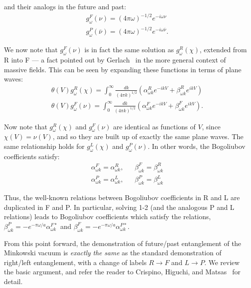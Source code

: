 \documentclass[aps,prl,showpacs,12pt]{revtex4}
\begin{document}
and their analogs in the future and past:
\begin{eqnarray*}
g_{\omega}^{F}(\nu) = (4 \pi \omega)^{-1/2} e^{-i \omega \nu} \\
g_{\omega}^{P}(\bar{\nu}) = (4 \pi \omega)^{-1/2} e^{-i \omega \bar{\nu}}.
\end{eqnarray*}

We now note that $g_{\omega}^{F}(\nu)$ is in fact the same solution as $g_{\omega}^{R}(\chi)$, extended from R into F \---- a fact pointed out by Gerlach~\cite{gerlach1, crispino1} in the more general context of massive fields.  This can be seen by expanding these functions in terms of plane waves:
\begin{eqnarray}
 \theta(V) g_{\omega}^{R}(\chi) = \int_{0}^{\infty} \frac{dk}{(4 \pi k)^{1/2}}\left( \alpha^{R}_{\omega k} e^{-ikV} + \beta^{R}_{\omega k} e^{ikV} \right) \\
 \theta(V) g_{\omega}^{F}(\nu) = \int_{0}^{\infty} \frac{dk}{(4 \pi k)^{1/2}}\left( \alpha^{F}_{\omega k} e^{-ikV} + \beta^{F}_{\omega k} e^{ikV} \right) .
\end{eqnarray}

Now note that $g_{\omega}^{R}(\chi)$ and $g_{\omega}^{F}(\nu)$ are identical as functions of $V$, since $\chi(V) = \nu(V)$, and so they are built up of exactly the same plane waves.  The same relationship holds for $g_{\omega}^{L}(\chi)$ and $g_{\omega}^{P}(\nu)$.  In other words, the Bogoliubov coefficients satisfy:
\begin{eqnarray*}
 \alpha^{F}_{\omega k} = \alpha^{R}_{\omega k}, && \beta^{F}_{\omega k} = \beta^{R}_{\omega k} \\
 \alpha^{P}_{\omega k} = \alpha^{L}_{\omega k}, && \beta^{P}_{\omega k} = \beta^{L}_{\omega k}\end{eqnarray*}

Thus, the well-known relations between Bogoliubov coefficients in R and L are duplicated in F and P.  In particular, solving 1-2 (and the analogous P and L relations) leads to Bogoliubov coefficients which satisfy the relations,  $\beta^{P}_{\omega k} = - e^{-\pi \omega / a} \alpha^{F \ast}_{\omega k}$ and $\beta^{F}_{\omega k} = - e^{-\pi \omega / a} \alpha^{P \ast}_{\omega k}$.

From this point forward, the demonstration of future/past entanglement of the Minkowski vacuum is \textit{exactly the same} as the standard demonstration of right/left entanglement, with a change of labels $R \rightarrow F$ and $L \rightarrow P$.  We review the basic argument, and refer the reader to Crispino, Higuchi, and Matsas~\cite{crispino1} for detail.
\end{document}
